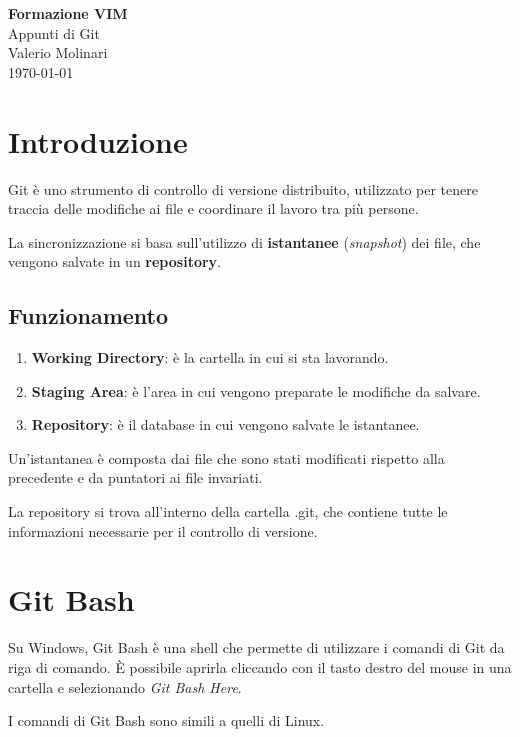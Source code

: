 \documentclass{article}
\begin{document}
\begin{titlepage}
\begin{center}
\vspace*{3cm}
\Huge\textcolor{primary}{\textbf{Formazione VIM}} \\[1cm]
\Large\textcolor{secondary}{Appunti di Git} \\[1cm]
\textcolor{accent}{Valerio Molinari}\\
\vfill
\today
\end{center}
\end{titlepage}

\tableofcontents
\newpage

\section{Introduzione}
Git è uno strumento di controllo di versione distribuito, 
utilizzato per tenere traccia delle modifiche ai file e 
coordinare il lavoro tra più persone.

La sincronizzazione si basa sull'utilizzo di \textbf{istantanee} 
(\textit{snapshot}) dei file, che vengono salvate in un
\textbf{repository}.


\subsection{Funzionamento}
\begin{enumerate}
    \item \textbf{Working Directory}: è la cartella in cui si sta lavorando.
    \item \textbf{Staging Area}: è l'area in cui vengono preparate le modifiche da salvare.
    \item \textbf{Repository}: è il database in cui vengono salvate le istantanee.
\end{enumerate}

Un'istantanea è composta dai file che sono stati modificati rispetto
alla precedente e da puntatori ai file invariati.

La repository si trova all'interno della cartella .git, che contiene
tutte le informazioni necessarie per il controllo di versione.


\section{Git Bash}
Su Windows, Git Bash è una shell che permette di utilizzare i comandi
di Git da riga di comando. È possibile aprirla cliccando con il tasto
destro del mouse in una cartella e selezionando \textit{Git Bash Here}.
\begin{highlight}
    I comandi di Git Bash sono simili a quelli di Linux.
\end{highlight}
\end{document}
